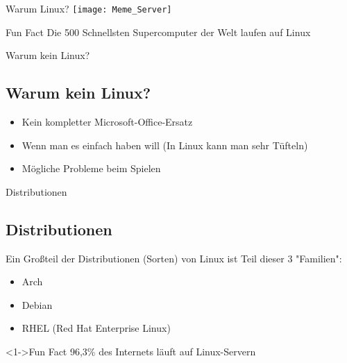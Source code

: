 \begin{frame}{Warum Linux?}
    \texttt{[image: Meme\_Server]}

    \begin{exampleblock}{Fun Fact}
        Die 500 Schnellsten Supercomputer der Welt laufen auf Linux
    \end{exampleblock}
\end{frame}

\begin{frame}{Warum kein Linux?}
    \subsection{Warum kein Linux?}\label{subsec:warum-kein-linux?}

    \begin{itemize}
        \item Kein kompletter Microsoft-Office-Ersatz
        \item Wenn man es einfach haben will (In Linux kann man sehr Tüfteln)
        \item Mögliche Probleme beim Spielen
    \end{itemize}

\end{frame}

\begin{frame}{Distributionen}
    \subsection{Distributionen}\label{subsec:distributionen}

    Ein Großteil der Distributionen (Sorten) von Linux ist Teil dieser 3 "Familien":

    \pause

    \begin{itemize}
        \item Arch
        \item Debian
        \item RHEL (Red Hat Enterprise Linux)
    \end{itemize}

    \begin{exampleblock}<1->{Fun Fact}
        96,3\% des Internets läuft auf Linux-Servern
    \end{exampleblock}

\end{frame}


